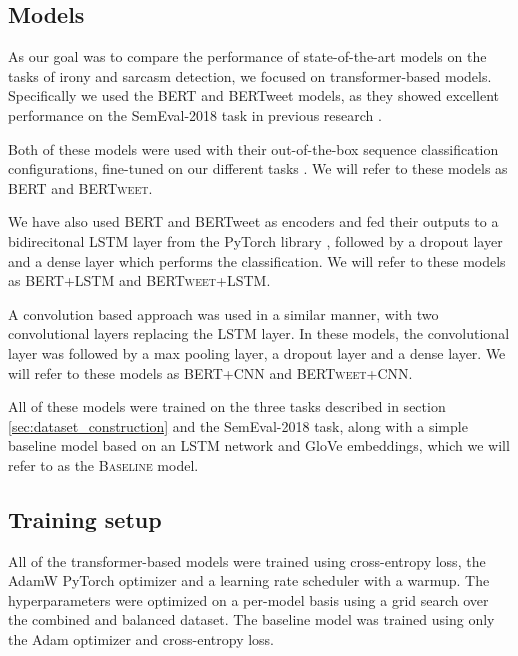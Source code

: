 \documentclass[10pt, a4paper]{article}
\begin{document}
\subsection{Models}\label{sec:models}

As our goal was to compare the performance of state-of-the-art models on the tasks of irony and sarcasm detection, we 
focused on transformer-based models. Specifically we used the BERT \citep{devlin-etal-2019-bert} and BERTweet \citep{bertweet} models,
as they showed excellent performance on the SemEval-2018 task in previous research \citep{transformers4irony-2020,bertweet}.

Both of these models were used with their out-of-the-box sequence classification configurations, fine-tuned on our 
different tasks \citep{wolf2020huggingfaces}. We will refer to these models as \textsc{BERT} and \textsc{BERTweet}.

We have also used BERT and BERTweet as encoders and fed their outputs to a bidirecitonal LSTM layer from the PyTorch library
\citep{paszke2017automatic}, followed by a dropout layer and a dense layer which performs the classification. We will refer
to these models as \textsc{BERT+LSTM} and \textsc{BERTweet+LSTM}. 

A convolution based approach was used in a similar manner, with two convolutional layers
replacing the LSTM layer. In these models, the convolutional layer was followed by a max pooling layer, a dropout layer
and a dense layer. We will refer to these models as \textsc{BERT+CNN} and \textsc{BERTweet+CNN}.

All of these models were trained on the three tasks described in section \ref{sec:dataset_construction} and the SemEval-2018
task, along with a simple baseline model based on an LSTM network and GloVe embeddings, which we will refer to as the
\textsc{Baseline} model. 

\subsection{Training setup}

All of the transformer-based models were trained using cross-entropy loss, the AdamW PyTorch optimizer and a
learning rate scheduler with a warmup. The hyperparameters were optimized on a per-model basis using a grid 
search over the combined and balanced dataset. The baseline model
was trained using only the Adam optimizer and cross-entropy loss.
\end{document}
